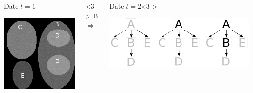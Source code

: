 \begin{frame}
\begin{columns}[c]
\begin{exampleblock}{Date $t=1$}
\begin{center}
						\includegraphics[trim= 0mm 0mm 0mm 0mm, clip, height=0.7\textwidth]{image/me_1_3_img_1.png}						
					\end{center}
				\end{exampleblock}
			\column{0.1em}<3->
				B\\			
				$\Rightarrow$
			\column{6em}
				\begin{exampleblock}{Date $t=2$}<3->
					\begin{center}
						\includegraphics[trim= 56mm 0mm 0mm 0mm, clip, height=0.7\textwidth]{image/contex_gt.pdf}	\vspace{1em}					

\end{center}
\end{exampleblock}
\end{columns}
\end{frame}
